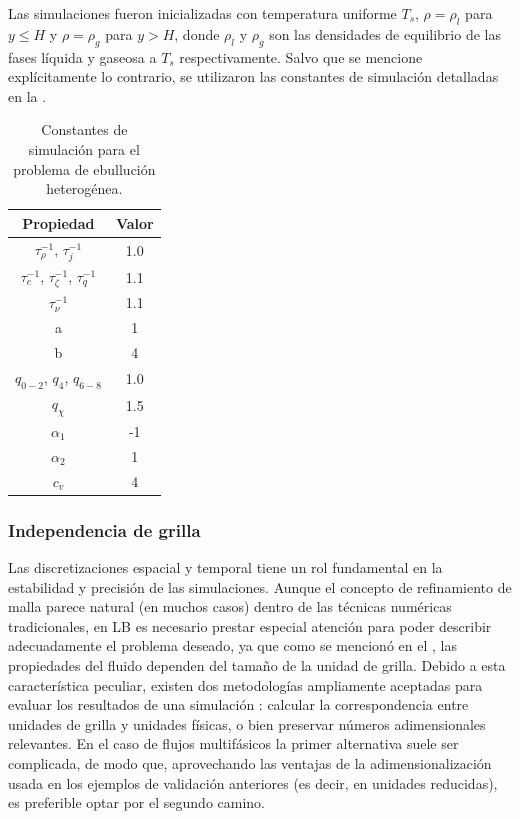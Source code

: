 Las simulaciones fueron inicializadas con temperatura uniforme $T_s$, $\rho = \rho_l$ para $y\leq H$ y $\rho = \rho_g$ para $y > H$, donde $\rho_l$ y $\rho_g$ son las densidades de equilibrio de las fases l\'iquida y gaseosa a $T_s$ respectivamente. Salvo que se mencione expl\'icitamente lo contrario, se utilizaron las constantes de simulaci\'on detalladas en la .

\begin{table}[ht]
	\centering
    \begin{tabular}{c c}
	    \toprule
        \bf Propiedad & \bf Valor \\
        \midrule
        $\tau_{\rho}^{-1}$, $\tau_{j}^{-1}$ & 1.0\\
        $\tau_{e}^{-1}$, $\tau_{\zeta}^{-1}$, $\tau_{q}^{-1}$ & 1.1 \\
        $\tau_{\nu}^{-1}$ & 1.1 \\
		a & 1 \\
		b & 4 \\
		$q_{0-2}$, $q_4$, $q_{6-8}$ & 1.0 \\
		$q_{\chi}$ & 1.5 \\
		$\alpha_1$ & -1 \\
		$\alpha_2$ & 1 \\
		$c_v$ & 4 \\
        \bottomrule
	\end{tabular}
	\caption{Constantes de simulaci\'on para el problema de ebulluci\'on heterog\'enea.}
	\label{tab:hetb_prop}
\end{table}  
\FloatBarrier


\subsubsection{Independencia de grilla}

Las discretizaciones espacial y temporal tiene un rol fundamental en la estabilidad y precisi\'on de las simulaciones. Aunque el concepto de refinamiento de malla parece natural (en muchos casos) dentro de las t\'ecnicas num\'ericas tradicionales, en LB es necesario prestar especial atenci\'on para poder describir adecuadamente el problema deseado, ya que como se mencion\'o en el , las propiedades del fluido dependen del tama\~no de la unidad de grilla. Debido a esta caracter\'istica peculiar, existen dos metodolog\'ias ampliamente aceptadas para evaluar los resultados de una simulaci\'on \cite{kruger_lattice_2017}: calcular la correspondencia entre unidades de grilla y unidades f\'isicas, o bien preservar n\'umeros adimensionales relevantes. En el caso de flujos multif\'asicos la primer alternativa suele ser complicada, de modo que, aprovechando las ventajas de la adimensionalizaci\'on usada en los ejemplos de validaci\'on anteriores (es decir, en unidades reducidas), es preferible optar por el segundo camino.

